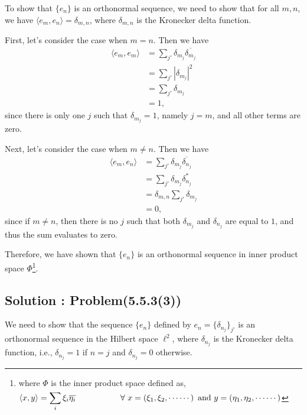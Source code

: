\documentclass[12pt, a4paper]{article} %
\begin{document}
        To show that $\{e_n\}$ is an orthonormal sequence, we need to show that for all $m,n$, we have $\langle e_m, e_n\rangle = \delta_{m,n}$, where $\delta_{m,n}$ is the Kronecker delta function.
        
        First, let's consider the case when $m=n$. Then we have
        \begin{align*}
        \langle e_m, e_m\rangle &= \sum_{j'} \delta_{m_j} \overline{\delta_{m_j}} \\
        &= \sum_{j'} |\delta_{m_j}|^2 \\
        &= \sum_{j'} \delta_{m_j} \\
        &= 1,
        \end{align*}
        since there is only one $j$ such that $\delta_{m_j} = 1$, namely $j=m$, and all other terms are zero.
        
        Next, let's consider the case when $m\neq n$. Then we have
        \begin{align*}
        \langle e_m, e_n\rangle &= \sum_{j'} \delta_{m_j} \overline{\delta_{n_j}} \\
        &= \sum_{j'} \delta_{m_j} \delta_{n_j}^* \\
        &= \delta_{m,n} \sum_{j'} \delta_{m_j} \\
        &= 0,
        \end{align*}
        since if $m\neq n$, then there is no $j$ such that both $\delta_{m_j}$ and $\delta_{n_j}$ are equal to $1$, and thus the sum evaluates to zero.
        
        Therefore, we have shown that $\{e_n\}$ is an orthonormal sequence in inner product space $\Phi$\footnote{where $\Phi$ is the inner product space defined as, $\displaystyle{\langle x, y \rangle = \sum_{i}^{}\xi_i \overline{\eta_{i}}} \hspace*{1.9cm} \forall\  x = \left(\xi_1, \xi_2, \cdots \cdots \right)\ \mbox{and}\ y = \left(\eta_1, \eta_2, \cdots \cdots\right)$}.

        \newpage

    \subsection{Solution : Problem(5.5.3(3))}

        We need to show that the sequence $\{e_n\}$ defined by $e_n = \{\delta_{n_j}\}_{j'}$ is an orthonormal sequence in the Hilbert space $\ell^2$, where $\delta_{n_j}$ is the Kronecker delta function, i.e., $\delta_{n_j} = 1$ if $n=j$ and $\delta_{n_j} = 0$ otherwise.
\end{document}
